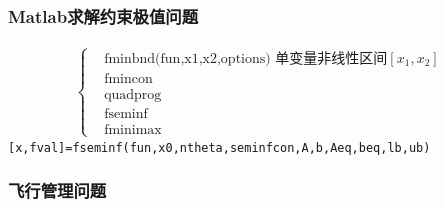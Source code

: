 \documentclass[11pt,a4paper]{ctexart}
\begin{document}
\subsubsection{Matlab求解约束极值问题}
\[ 
  \begin{aligned}
    \left\{
      \begin{array}{rl}
        & \text{fminbnd(fun,x1,x2,options)    单变量非线性区间}[x_1,x_2] \\
      & \text{fmincon} \\
      & \text{quadprog} \\
      & \text{fseminf} \\
      & \text{fminimax} 
      \end{array}
    \right.
  \end{aligned}
\]
\colorbox{mygrey}{\color{myred}\lstinline|[x,fval]=fseminf(fun,x0,ntheta,seminfcon,A,b,Aeq,beq,lb,ub)|}

\subsubsection{飞行管理问题}
\end{document}
